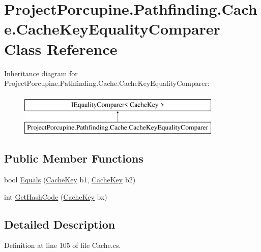 \hypertarget{class_project_porcupine_1_1_pathfinding_1_1_cache_1_1_cache_key_equality_comparer}{}\section{Project\+Porcupine.\+Pathfinding.\+Cache.\+Cache\+Key\+Equality\+Comparer Class Reference}
\label{class_project_porcupine_1_1_pathfinding_1_1_cache_1_1_cache_key_equality_comparer}
Inheritance diagram for Project\+Porcupine.\+Pathfinding.\+Cache.\+Cache\+Key\+Equality\+Comparer\+:\begin{figure}[H]
\begin{center}
\leavevmode
\includegraphics[height=2.000000cm]{class_project_porcupine_1_1_pathfinding_1_1_cache_1_1_cache_key_equality_comparer}
\end{center}
\end{figure}
\subsection*{Public Member Functions}
\begin{DoxyCompactItemize}
\item 
bool \hyperlink{class_project_porcupine_1_1_pathfinding_1_1_cache_1_1_cache_key_equality_comparer_ae11df903bf117b07ae154c618f1acf40}{Equals} (\hyperlink{class_project_porcupine_1_1_pathfinding_1_1_cache_1_1_cache_key}{Cache\+Key} b1, \hyperlink{class_project_porcupine_1_1_pathfinding_1_1_cache_1_1_cache_key}{Cache\+Key} b2)
\item 
int \hyperlink{class_project_porcupine_1_1_pathfinding_1_1_cache_1_1_cache_key_equality_comparer_a20557163ee58be4e1cc03f9a63346133}{Get\+Hash\+Code} (\hyperlink{class_project_porcupine_1_1_pathfinding_1_1_cache_1_1_cache_key}{Cache\+Key} bx)
\end{DoxyCompactItemize}


\subsection{Detailed Description}


Definition at line 105 of file Cache.\+cs.



